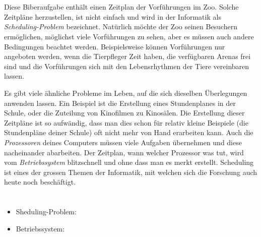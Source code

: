 {{%
\section*{\BrochureItsInformatics}
Diese Biberaufgabe enthält einen Zeitplan der Vorführungen im Zoo. Solche Zeitpläne herzustellen, ist nicht einfach und wird in der Informatik als \emph{Scheduling-Problem} bezeichnet. Natürlich möchte der Zoo seinen Besuchern ermöglichen, möglichst viele Vorführungen zu sehen, aber es müssen auch andere Bedingungen beachtet werden. Beispielsweise können Vorführungen nur angeboten werden, wenn die Tierpfleger Zeit haben, die verfügbaren Arenas frei sind und die Vorführungen sich mit den Lebensrhythmen der Tiere vereinbaren lassen.

Es gibt viele ähnliche Probleme im Leben, auf die sich dieselben Überlegungen anwenden lassen. Ein Beispiel ist die Erstellung eines Stundenplanes in der Schule, oder die Zuteilung von Kinofilmen zu Kinosälen. Die Erstellung dieser Zeitpläne ist so aufwändig, dass man dies schon für relativ kleine Beispiele (die Stundenpläne deiner Schule) oft nicht mehr von Hand erarbeiten kann. Auch die \emph{Prozessoren} deines Computers müssen viele Aufgaben übernehmen und diese nacheinander abarbeiten. Der Zeitplan, wann welcher Prozessor was tut, wird vom \emph{Betriebssystem} blitzschnell und ohne dass man es merkt erstellt. Scheduling ist eines der grossen Themen der Informatik, mit welchen sich die Forschung auch heute noch beschäftigt.



\section*{\BrochureWebsitesAndKeywords}
{\raggedright
\begin{itemize}
  \item Sheduling-Problem: \href{https://de.wikipedia.org/wiki/Scheduling}{}
  \item Betriebssystem: \href{https://de.wikipedia.org/wiki/Betriebssystem}{}
\end{itemize}


}

}{}

}
